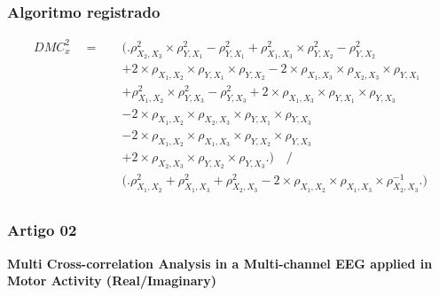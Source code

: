 \documentclass[11pt, aspectratio=169]{beamer}
\begin{document}
\begin{frame}
  \frametitle{Algoritmo registrado}

  \begin{equation}
    \begin{split}
      DMC_{x}^{2} \quad = \quad & \Big( \Big. \rho^{2}_{X_{2},X_{3}} \times \rho^{2}_{Y,X_{1}}- \rho^{2}_{Y,X_{1}} + \rho^{2}_{X_{1},X_{3}}\times \rho^{2}_{Y,X_{2}}-\rho^{2}_{Y,X_{2}} \\
      &+ 2 \times \rho_{X_{1},X_{2}} \times \rho_{Y,X_{1}} \times \rho_{Y,X_{2}}   - 2 \times \rho_{X_{1},X_{3}} \times \rho_{X_{2},X_{3}} \times \rho_{Y,X_{1}} \\
      &+ \rho^{2}_{X_{1},X_{2}} \times \rho^{2}_{Y,X_{3}}-\rho^{2}_{Y,X_{3}} + 2 \times \rho_{X_{1},X_{3}} \times \rho_{Y,X_{1}} \times \rho_{Y,X_{3}} \\
      &- 2 \times \rho_{X_{1},X_{2}} \times \rho_{X_{2},X_{3}} \times \rho_{Y,X_{1}} \times \rho_{Y,X_{3}} \\
      &- 2 \times \rho_{X_{1},X_{2}} \times \rho_{X_{1},X_{3}} \times \rho_{Y,X_{2}} \times \rho_{Y,X_{3}} \\
      &+ 2 \times \rho_{X_{2},X_{3}} \times \rho_{Y,X_{2}} \times \rho_{Y,X_{3}} \Big. \Big)    \quad \Big/ \\
      & \Big( \Big. \rho^{2}_{X_{1},X_{2}} + \rho^{2}_{X_{1},X_{3}} + \rho^{2}_{X_{2},X_{3}} - 2 \times \rho_{X_{1},X_{2}} \times \rho_{X_{1},X_{3}} \times \rho_{X_{2},X_{3}}^{-1}\Big. \Big)  \\
    \end{split}
    \label{eq:dmc_3x_y}
  \end{equation}

\end{frame}

\begin{frame}
  \frametitle{Artigo 02}

\textbf{\Large{Multi Cross-correlation Analysis in a Multi-channel EEG applied in Motor Activity (Real/Imaginary)}}

\end{frame}
\end{document}
